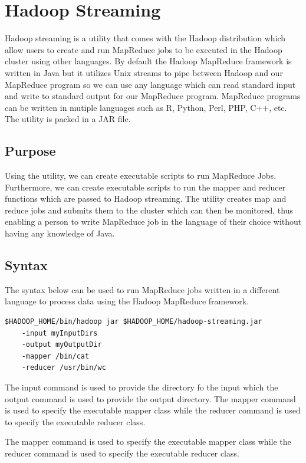 \documentclass[11pt]{book}
\begin{document}
\chapter{Hadoop Streaming}

Hadoop streaming is a utility that comes with the Hadoop distribution which allow users to create and run MapReduce jobs to be executed in the Hadoop cluster using other languages. By default the Hadoop MapReduce framework is written in Java but it utilizes Unix streams to pipe between Hadoop and our MapReduce program so we can use any language which can read standard input and write to standard output for our MapReduce program. MapReduce programs can be written in mutiple languages such as R, Python, Perl, PHP, C++, etc. The utility is packed in a JAR file. 

\section{Purpose}

Using the utility, we can create executable scripts to run MapReduce Jobs. Furthermore, we can create executable scripts to run the mapper and reducer functions which are passed to Hadoop streaming. The utility creates map and reduce jobs and submits them to the cluster which can then be monitored, thus enabling a person to write MapReduce job in the language of their choice without having any knowledge of Java.

\section{Syntax}

The syntax below can be used to run MapReduce jobs written in a different language to process data using the Hadoop MapReduce framework.\\

\begin{verbatim}
$HADOOP_HOME/bin/hadoop jar $HADOOP_HOME/hadoop-streaming.jar 
    -input myInputDirs 
    -output myOutputDir 
    -mapper /bin/cat 
    -reducer /usr/bin/wc
\end{verbatim}

The input command is used to provide the directory fo the input which the output command is used to provide the output directory. The mapper command is used to specify the executable mapper class while the reducer command is used to specify the executable reducer class.

The mapper command is used to specify the executable mapper class while the reducer command is used to specify the executable reducer class.
\end{document}
